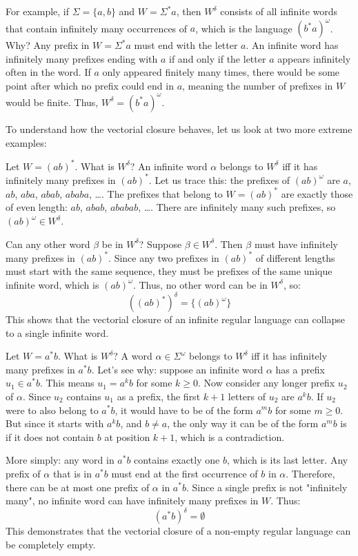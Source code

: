 For example, if $\Sigma = \{a,b\}$ and $W = \Sigma^* a$, then $W^\delta$ consists of all infinite words that contain infinitely many occurrences of $a$, which is the language $(b^*a)^\omega$.
Why? Any prefix in $W = \Sigma^* a$ must end with the letter $a$. An infinite word has infinitely many prefixes ending with $a$ if and only if the letter $a$ appears infinitely often in the word. If $a$ only appeared finitely many times, there would be some point after which no prefix could end in $a$, meaning the number of prefixes in $W$ would be finite. Thus, $W^\delta = (b^*a)^\omega$.

To understand how the vectorial closure behaves, let us look at two more extreme examples:
\begin{example}
Let $W = (ab)^*$. What is $W^\delta$? An infinite word $\alpha$ belongs to $W^\delta$ iff it has infinitely many prefixes in $(ab)^*$.
Let us trace this: the prefixes of $(ab)^\omega$ are $a$, $ab$, $aba$, $abab$, $ababa$, \dots. The prefixes that belong to $W = (ab)^*$ are exactly those of even length: $ab$, $abab$, $ababab$, \dots. There are infinitely many such prefixes, so $(ab)^\omega \in W^\delta$.

Can any other word $\beta$ be in $W^\delta$? Suppose $\beta \in W^\delta$. Then $\beta$ must have infinitely many prefixes in $(ab)^*$. Since any two prefixes in $(ab)^*$ of different lengths must start with the same sequence, they must be prefixes of the same unique infinite word, which is $(ab)^\omega$. Thus, no other word can be in $W^\delta$, so:
$$((ab)^*)^\delta = \{(ab)^\omega\}$$
This shows that the vectorial closure of an infinite regular language can collapse to a single infinite word.
\end{example}

\begin{example}
Let $W = a^* b$. What is $W^\delta$? A word $\alpha \in \Sigma^\omega$ belongs to $W^\delta$ iff it has infinitely many prefixes in $a^* b$.
Let's see why: suppose an infinite word $\alpha$ has a prefix $u_1 \in a^*b$. This means $u_1 = a^k b$ for some $k \ge 0$.
Now consider any longer prefix $u_2$ of $\alpha$. Since $u_2$ contains $u_1$ as a prefix, the first $k+1$ letters of $u_2$ are $a^k b$. If $u_2$ were to also belong to $a^*b$, it would have to be of the form $a^m b$ for some $m \ge 0$. But since it starts with $a^k b$, and $b \neq a$, the only way it can be of the form $a^m b$ is if it does not contain $b$ at position $k+1$, which is a contradiction.

More simply: any word in $a^*b$ contains exactly one $b$, which is its last letter. Any prefix of $\alpha$ that is in $a^*b$ must end at the first occurrence of $b$ in $\alpha$. Therefore, there can be at most one prefix of $\alpha$ in $a^*b$. Since a single prefix is not "infinitely many", no infinite word can have infinitely many prefixes in $W$. Thus:
$$(a^* b)^\delta = \emptyset$$
This demonstrates that the vectorial closure of a non-empty regular language can be completely empty.
\end{example}

